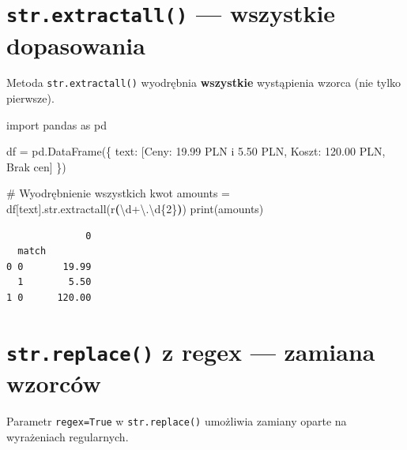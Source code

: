 \documentclass[
  polish,
  letterpaper,
  DIV=11,
  numbers=noendperiod]{scrreprt}
\newenvironment{Shaded}{\begin{snugshade}}{\end{snugshade}}
\newcommand{\BuiltInTok}[1]{\textcolor[rgb]{0.00,0.23,0.31}{#1}}
\newcommand{\CharTok}[1]{\textcolor[rgb]{0.13,0.47,0.30}{#1}}
\newcommand{\CommentTok}[1]{\textcolor[rgb]{0.37,0.37,0.37}{#1}}
\newcommand{\DecValTok}[1]{\textcolor[rgb]{0.68,0.00,0.00}{#1}}
\newcommand{\ImportTok}[1]{\textcolor[rgb]{0.00,0.46,0.62}{#1}}
\newcommand{\KeywordTok}[1]{\textcolor[rgb]{0.00,0.23,0.31}{\textbf{#1}}}
\newcommand{\NormalTok}[1]{\textcolor[rgb]{0.00,0.23,0.31}{#1}}
\newcommand{\OperatorTok}[1]{\textcolor[rgb]{0.37,0.37,0.37}{#1}}
\newcommand{\StringTok}[1]{\textcolor[rgb]{0.13,0.47,0.30}{#1}}
\newcommand{\VerbatimStringTok}[1]{\textcolor[rgb]{0.13,0.47,0.30}{#1}}
\begin{document}
\section{\texorpdfstring{\texttt{str.extractall()} --- wszystkie
dopasowania}{str.extractall() --- wszystkie dopasowania}}\label{str.extractall-wszystkie-dopasowania}

Metoda \texttt{str.extractall()} wyodrębnia \textbf{wszystkie}
wystąpienia wzorca (nie tylko pierwsze).

\begin{Shaded}
\begin{Highlighting}[]
\ImportTok{import}\NormalTok{ pandas }\ImportTok{as}\NormalTok{ pd}

\NormalTok{df }\OperatorTok{=}\NormalTok{ pd.DataFrame(\{}
    \StringTok{\textquotesingle{}text\textquotesingle{}}\NormalTok{: [}\StringTok{\textquotesingle{}Ceny: 19.99 PLN i 5.50 PLN\textquotesingle{}}\NormalTok{, }\StringTok{\textquotesingle{}Koszt: 120.00 PLN\textquotesingle{}}\NormalTok{, }\StringTok{\textquotesingle{}Brak cen\textquotesingle{}}\NormalTok{]}
\NormalTok{\})}

\CommentTok{\# Wyodrębnienie wszystkich kwot}
\NormalTok{amounts }\OperatorTok{=}\NormalTok{ df[}\StringTok{\textquotesingle{}text\textquotesingle{}}\NormalTok{].}\BuiltInTok{str}\NormalTok{.extractall(}\VerbatimStringTok{r\textquotesingle{}}\KeywordTok{(}\DecValTok{\textbackslash{}d}\OperatorTok{+}\CharTok{\textbackslash{}.}\DecValTok{\textbackslash{}d}\OperatorTok{\{2\}}\KeywordTok{)}\VerbatimStringTok{\textquotesingle{}}\NormalTok{)}
\BuiltInTok{print}\NormalTok{(amounts)}
\end{Highlighting}
\end{Shaded}

\begin{verbatim}
              0
  match        
0 0       19.99
  1        5.50
1 0      120.00
\end{verbatim}

\section{\texorpdfstring{\texttt{str.replace()} z regex --- zamiana
wzorców}{str.replace() z regex --- zamiana wzorców}}\label{str.replace-z-regex-zamiana-wzorcuxf3w}

Parametr \texttt{regex=True} w \texttt{str.replace()} umożliwia zamiany
oparte na wyrażeniach regularnych.
\end{document}
